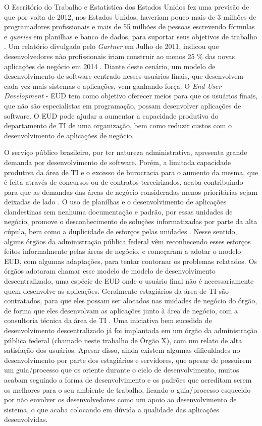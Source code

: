 O Escritório do Trabalho e Estatística dos Estados Unidos fez uma previsão de que por volta de 2012, nos Estados Unidos, haveriam pouco mais de 3 milhões de programadores profissionais e mais de 55 milhões de pessoas escrevendo fórmulas e \textit{queries} em planilhas e banco de dados, para suportar seus objetivos de trabalho \cite{scaffidi2005}. Um relatório divulgado pelo \textit{Gartner} em Julho de 2011, indicou que desenvolvedores não profissionais iriam construir ao menos 25 \% das novas aplicações de negócio em 2014 \cite{paterno2013}. Diante deste cenário, um modelo de desenvolvimento de software centrado nesses usuários finais, que desenvolvem cada vez mais sistemas e aplicações, vem ganhando força. O \textit{End User Development} - EUD tem como objetivo oferecer meios para que os usuários finais, que não são especialistas em programação, possam desenvolver aplicações de software. O EUD pode ajudar a aumentar a capacidade produtiva do departamento de TI de uma organização, bem como reduzir custos com o desenvolvimento de aplicações de negócio.

O serviço público brasileiro, por ter natureza administrativa, apresenta grande demanda por desenvolvimento de software. Porém, a limitada capacidade produtiva da área de TI e o excesso de burocracia para o aumento da mesma, que é feita através de concursos ou de contratos terceirizados, acaba contribuindo para que as demandas das áreas de negócio consideradas menos prioritárias sejam deixadas de lado \cite{artigoTcuGovTI}. O uso de planilhas e o desenvolvimento de aplicações clandestinas sem nenhuma documentação e padrão, por essas unidades de negócio, promove o desconhecimento de soluções informatizadas por parte da alta cúpula, bem como a duplicidade de esforços pelas unidades \cite{slideTCU}. Nesse sentido, alguns órgãos da administração pública federal vêm reconhecendo esses esforços feitos informalmente pelas áreas de negócio, e começaram a adotar o modelo EUD, com algumas adaptações, para tentar contornar os problemas relatados. Os órgãos adotaram chamar esse modelo de modelo de desenvolvimento descentralizado, uma espécie de EUD onde o usuário final não é necessariamente quem desenvolve as aplicações. Geralmente estagiários da área de TI são contratados, para que eles possam ser alocados nas unidades de negócio do órgão, de forma que eles desenvolvam as aplicações junto à área de negócio, com a consultoria técnica da área de TI \cite{slideTCU}. Uma iniciativa bem sucedida de desenvolvimento descentralizado já foi implantada em um órgão da administração pública federal (chamado neste trabalho de Órgão X), com um relato de alta satisfação dos usuários. Apesar disso, ainda existem algumas dificuldades no desenvolvimento por parte dos estagiários e servidores, que apesar de possuirem um guia/processo que os oriente durante o ciclo de desenvolvimento, muitos acabam seguindo a forma de desenvolvimento e os padrões que acreditam serem os melhores para o seu ambiente de trabalho, ficando o guia/processo esquecido por não envolver os desenvolvedores como um apoio ao desenvolvimento de sistema, o que acaba colocando em dúvida a qualidade das aplicações desenvolvidas. 

